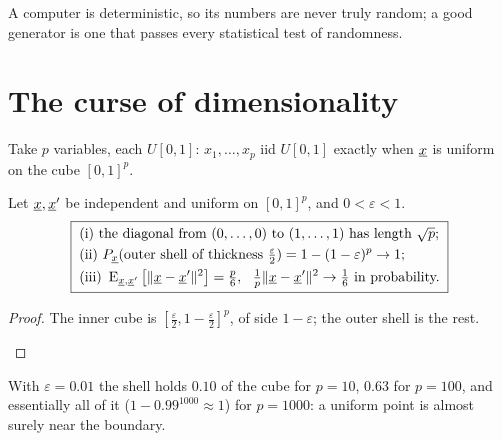 A computer is deterministic, so its numbers are never truly random; a good generator is one that passes every statistical test of randomness.

\section{The curse of dimensionality}

Take $p$ variables, each $U[0,1]$: $x_1,\dots,x_p$ iid $U[0,1]$ exactly when $\underline{x}$ is uniform on the cube $[0,1]^p$.

\begin{result}
Let $\underline{x},\underline{x}'$ be independent and uniform on $[0,1]^p$, and $0<\varepsilon<1$.
\[
  \boxed{\;\begin{aligned}
  &\text{(i) the diagonal from }(0,\dots,0)\text{ to }(1,\dots,1)\text{ has length }\sqrt p;\\
  &\text{(ii) }P_{\vect{x}}(\text{outer shell of thickness }\tfrac\varepsilon2)=1-(1-\varepsilon)^p\to1;\\
  &\text{(iii) }\E_{\vect{x},\vect{x}'}\big[\|\vect{x}-\vect{x}'\|^2\big]=\tfrac p6,\ \ \tfrac1p\|\vect{x}-\vect{x}'\|^2\to\tfrac16\text{ in probability.}
  \end{aligned}\;}
\]
\end{result}
\begin{proof}
The inner cube is $[\frac\varepsilon2,1-\frac\varepsilon2]^p$, of side $1-\varepsilon$; the outer shell is the rest.
\begin{deriv}
\end{deriv}
\end{proof}

With $\varepsilon=0.01$ the shell holds $0.10$ of the cube for $p=10$, $0.63$ for $p=100$, and essentially all of it ($1-0.99^{1000}\approx1$) for $p=1000$: a uniform point is almost surely near the boundary.

